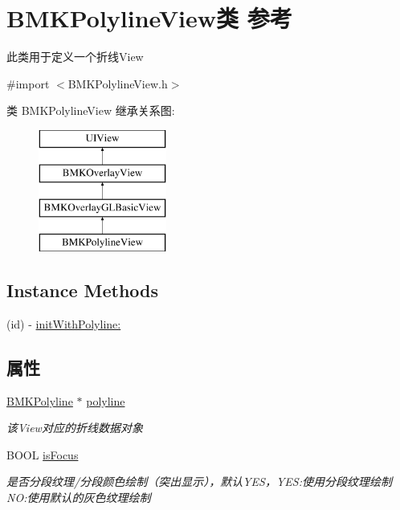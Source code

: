 \hypertarget{interface_b_m_k_polyline_view}{}\section{B\+M\+K\+Polyline\+View类 参考}
\label{interface_b_m_k_polyline_view}


此类用于定义一个折线\+View  




{\ttfamily \#import $<$B\+M\+K\+Polyline\+View.\+h$>$}

类 B\+M\+K\+Polyline\+View 继承关系图\+:\begin{figure}[H]
\begin{center}
\leavevmode
\includegraphics[height=4.000000cm]{interface_b_m_k_polyline_view}
\end{center}
\end{figure}
\subsection*{Instance Methods}
\begin{DoxyCompactItemize}
\item 
(id) -\/ \hyperlink{interface_b_m_k_polyline_view_a9e771508504ccb0fdf491dcb406e23ed}{init\+With\+Polyline\+:}
\end{DoxyCompactItemize}
\subsection*{属性}
\begin{DoxyCompactItemize}
\item 
\hypertarget{interface_b_m_k_polyline_view_a780ecfc589530cc4514e790422730e5f}{}\hyperlink{interface_b_m_k_polyline}{B\+M\+K\+Polyline} $\ast$ \hyperlink{interface_b_m_k_polyline_view_a780ecfc589530cc4514e790422730e5f}{polyline}\label{interface_b_m_k_polyline_view_a780ecfc589530cc4514e790422730e5f}

\begin{DoxyCompactList}\small\item\em 该\+View对应的折线数据对象 \end{DoxyCompactList}\item 
\hypertarget{interface_b_m_k_polyline_view_a0c744e1295344416025ba5c91ed87a80}{}B\+O\+O\+L \hyperlink{interface_b_m_k_polyline_view_a0c744e1295344416025ba5c91ed87a80}{is\+Focus}\label{interface_b_m_k_polyline_view_a0c744e1295344416025ba5c91ed87a80}

\begin{DoxyCompactList}\small\item\em 是否分段纹理/分段颜色绘制（突出显示），默认\+Y\+E\+S，\+Y\+E\+S\+:使用分段纹理绘制 N\+O\+:使用默认的灰色纹理绘制 \end{DoxyCompactList}\end{DoxyCompactItemize}
